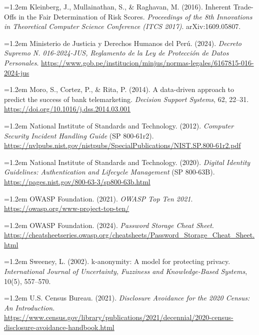 \documentclass[11pt,a4paper]{article}
\newcommand{\refitem}[1]{\par\noindent\hangindent=1.2em\hangafter=1 #1\par\smallskip}
\begin{document}
\refitem{Kleinberg, J., Mullainathan, S., \& Raghavan, M. (2016). Inherent Trade-Offs in the Fair
Determination of Risk Scores. \emph{Proceedings of the 8th Innovations in Theoretical Computer
Science Conference (ITCS 2017)}. arXiv:1609.05807.}

\refitem{Ministerio de Justicia y Derechos Humanos del Perú. (2024). \emph{Decreto Supremo
N.\textdegree{} 016-2024-JUS, Reglamento de la Ley de Protección de Datos Personales}.
\url{https://www.gob.pe/institucion/minjus/normas-legales/6167815-016-2024-jus}}

\refitem{Moro, S., Cortez, P., \& Rita, P. (2014). A data-driven approach to predict the success
of bank telemarketing. \emph{Decision Support Systems}, 62, 22--31.
\url{https://doi.org/10.1016/j.dss.2014.03.001}}

\refitem{National Institute of Standards and Technology. (2012). \emph{Computer Security Incident
Handling Guide} (SP 800-61r2).
\url{https://nvlpubs.nist.gov/nistpubs/SpecialPublications/NIST.SP.800-61r2.pdf}}

\refitem{National Institute of Standards and Technology. (2020). \emph{Digital Identity
Guidelines: Authentication and Lifecycle Management} (SP 800-63B).
\url{https://pages.nist.gov/800-63-3/sp800-63b.html}}

\refitem{OWASP Foundation. (2021). \emph{OWASP Top Ten 2021}.
\url{https://owasp.org/www-project-top-ten/}}

\refitem{OWASP Foundation. (2024). \emph{Password Storage Cheat Sheet}.
\url{https://cheatsheetseries.owasp.org/cheatsheets/Password_Storage_Cheat_Sheet.html}}

\refitem{Sweeney, L. (2002). k-anonymity: A model for protecting privacy. \emph{International
Journal of Uncertainty, Fuzziness and Knowledge-Based Systems}, 10(5), 557--570.}

\refitem{U.S. Census Bureau. (2021). \emph{Disclosure Avoidance for the 2020 Census: An
Introduction}.
\url{https://www.census.gov/library/publications/2021/decennial/2020-census-disclosure-avoidance-handbook.html}}
\end{document}
